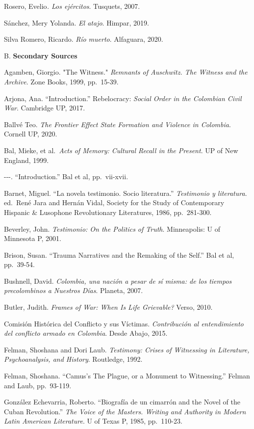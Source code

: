 \documentclass[
  11pt,
,
onecolumn,
openany
]{book}
\begin{document}
Rosero, Evelio\emph{. Los ejércitos}. Tusquets, 2007.

Sánchez, Mery Yolanda. \emph{El atajo}. Himpar, 2019.

Silva Romero, Ricardo. \emph{Río muerto}. Alfaguara, 2020.

B. \textbf{Secondary Sources}

Agamben, Giorgio. "The Witness." \emph{Remnants of Auschwitz. The Witness and
the Archive}. Zone Books, 1999, pp.~15-39.

Arjona, Ana. ``Introduction.'' Rebelocracy: \emph{Social Order in the
Colombian Civil War}. Cambridge UP, 2017.

Ballvé Teo. \emph{The Frontier Effect State Formation and Violence in
Colombia}. Cornell UP, 2020.

Bal, Mieke, et al.~\emph{Acts of Memory: Cultural Recall in the Present}. UP
of New England, 1999.

-\/-\/-. ``Introduction.'' Bal et al, pp.~vii-xvii.

Barnet, Miguel. ``La novela testimonio. Socio literatura.'' \emph{Testimonio y
literatura}. ed.~René Jara and Hernán Vidal, Society for the Study of
Contemporary Hispanic \& Lusophone Revolutionary Literatures, 1986,
pp.~281-300.

Beverley, John. \emph{Testimonio: On the Politics of Truth}. Minneapolis: U of
Minnesota P, 2001.

Brison, Susan. ``Trauma Narratives and the Remaking of the Self.'' Bal et al,
pp.~39-54.

Bushnell, David. \emph{Colombia, una nación a pesar de sí misma: de los
tiempos precolombinos a Nuestros Días}. Planeta, 2007.

Butler, Judith. \emph{Frames of War: When Is Life Grievable?} Verso, 2010.

Comisión Histórica del Conflicto y sus Víctimas. \emph{Contribución al
entendimiento del conflicto armado en Colombia}. Desde Abajo, 2015.

Felman, Shoshana and Dori Laub. \emph{Testimony: Crises of Witnessing in
Literature, Psychoanalysis, and History}. Routledge, 1992.

Felman, Shoshana. ``Camus's The Plague, or a Monument to Witnessing.'' Felman
and Laub, pp.~93-119.

González Echevarria, Roberto. ``Biografía de un cimarrón and the Novel of the
Cuban Revolution.'' \emph{The Voice of the Masters. Writing and Authority in
Modern Latin American Literature}. U of Texas P, 1985, pp.~110-23.
\end{document}

